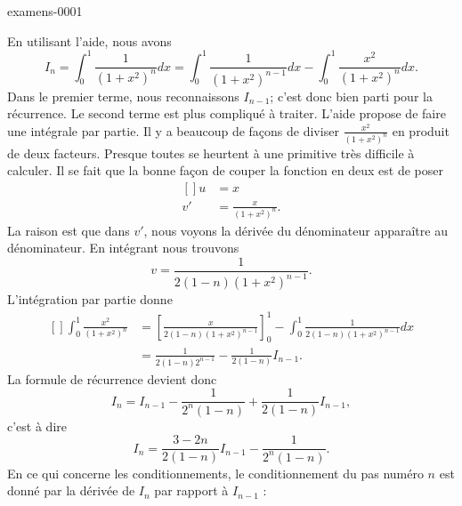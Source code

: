 
\begin{corrige}{examens-0001}

	En utilisant l'aide, nous avons
	\begin{equation}
		I_n=\int_0^1\frac{1}{ (1+x^2)^n }dx=\int_0^1\frac{1}{ (1+x^2)^{n-1} }dx-\int_0^1\frac{ x^2 }{ (1+x^2)^n }dx.
	\end{equation}
	Dans le premier terme, nous reconnaissons $I_{n-1}$; c'est donc bien parti pour la récurrence. Le second terme est plus compliqué à traiter. L'aide propose de faire une intégrale par partie. Il y a beaucoup de façons de diviser $\frac{ x^2 }{ (1+x^2)^n }$ en produit de deux facteurs. Presque toutes se heurtent à une primitive très difficile à calculer. Il se fait que la bonne façon de couper la fonction en deux est de poser
	\begin{equation}
		\begin{aligned}[]
			u&=x\\
			v'&=\frac{ x }{ (1+x^2)^n }.
		\end{aligned}
	\end{equation}
	La raison est que dans $v'$, nous voyons la dérivée du dénominateur apparaître au dénominateur. En intégrant nous trouvons
	\begin{equation}
		v=\frac{1}{ 2(1-n)(1+x^2)^{n-1} }.
	\end{equation}
	L'intégration par partie donne
	\begin{equation}
		\begin{aligned}[]
			\int_0^1\frac{ x^2 }{ (1+x^2)^n }&=\left[ \frac{ x }{ 2(1-n)(1+x^2)^{n-1} } \right]_0^1-\int_0^1\frac{1}{ 2(1-n)(1+x^2)^{n-1} }dx\\
			&=\frac{1}{ 2(1-n)2^{n-1} }-\frac{1}{ 2(1-n) }I_{n-1}.
		\end{aligned}
	\end{equation}
	La formule de récurrence devient donc
	\begin{equation}
		I_n=I_{n-1}-\frac{1}{ 2^n(1-n) }+\frac{1}{ 2(1-n) }I_{n-1},
	\end{equation}
	c'est à dire
	\begin{equation}
		I_n=\frac{ 3-2n }{ 2(1-n) }I_{n-1}-\frac{1}{ 2^n(1-n) }.
	\end{equation}
	En ce qui concerne les conditionnements, le conditionnement du pas numéro $n$ est donné par la dérivée de $I_n$ par rapport à $I_{n-1}$ :

\end{corrige}
